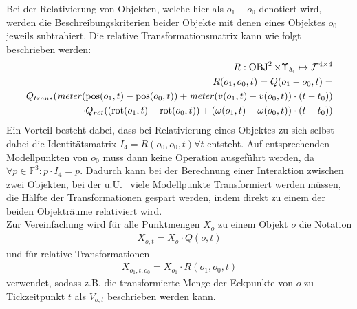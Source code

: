 Bei der Relativierung von Objekten, welche hier als $o_1 - o_0$ denotiert wird, werden die Beschreibungskriterien beider Objekte mit denen eines Objektes $o_0$ jeweils subtrahiert. Die relative Transformationsmatrix kann wie folgt beschrieben werden:
\begin{align}
	R: \operatorname{OBJ}^2 \times \Upsilon_{\delta_i} \mapsto \mathcal{F}^{4\times 4} \\
	R(o_1, o_0, t) = Q(o_1 - o_0, t) = \\
	Q_{trans}( \mathit{meter}( \operatorname{pos} (o_1, t) - \operatorname{pos} (o_0, t) ) + \mathit{meter}(v(o_1, t)-v(o_0, t)) \cdot (t-t_0) ) \\
	\cdot Q_{rot}((\operatorname{rot} (o_1, t) - \operatorname{rot} (o_0, t)) + (\omega(o_1, t)-\omega(o_0, t)) \cdot (t-t_0))
\end{align}
Ein Vorteil besteht dabei, dass bei Relativierung eines Objektes zu sich selbst dabei die Identitätsmatrix $I_4 = R(o_0, o_0, t) \forall t$ entsteht. Auf entsprechenden Modellpunkten von $o_0$ muss dann keine Operation ausgeführt werden, da $\forall p\in \mathbb{F}^3: p\cdot I_4=p$. Dadurch kann bei der Berechnung einer Interaktion zwischen zwei Objekten, bei der u.U.~ viele Modellpunkte Transformiert werden müssen, die Hälfte der Transformationen gespart werden, indem direkt zu einem der beiden Objekträume relativiert wird.\\
Zur Vereinfachung wird für alle Punktmengen $X_o$ zu einem Objekt $o$ die Notation
\begin{align}
	X_{o, t} = X_o \cdot Q(o, t)
\end{align}
und für relative Transformationen
\begin{align}
	X_{o_1, t, o_0} = X_{o_1} \cdot R(o_1, o_0, t)
\end{align}
verwendet, sodass z.B. die transformierte Menge der Eckpunkte von $o$ zu Tickzeitpunkt $t$ als $V_{o,t}$ beschrieben werden kann.

